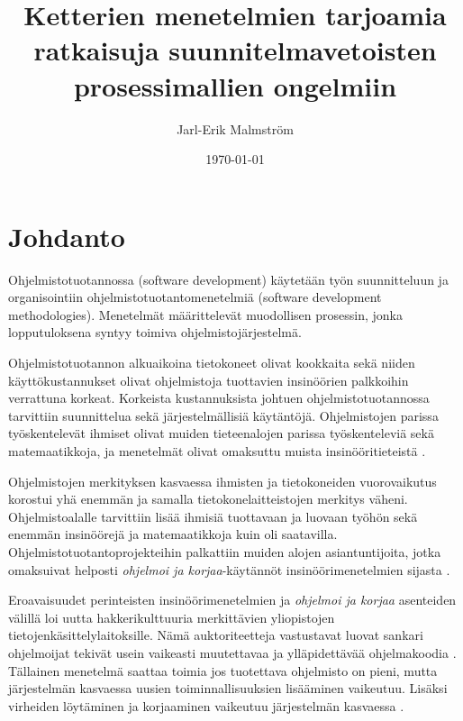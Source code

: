 \documentclass[finnish]{tktltiki2}
\title{Ketterien menetelmien tarjoamia ratkaisuja suunnitelmavetoisten prosessimallien ongelmiin}
\author{Jarl-Erik Malmström}
\date{\today}
\theoremstyle{definition}
\theoremstyle{remark}
\begin{document}

\maketitle        %
\makeabstract     %

\tableofcontents  %
\newpage          %



\section{Johdanto}
 
Ohjelmistotuotannossa (software development) käytetään työn suunnitteluun ja organisointiin ohjelmistotuotantomenetelmiä (software development methodologies). Menetelmät määrittelevät muodollisen prosessin, jonka lopputuloksena syntyy toimiva ohjelmistojärjestelmä.

Ohjelmistotuotannon alkuaikoina tietokoneet olivat kookkaita sekä niiden käyttö\-kustannukset olivat ohjelmistoja tuottavien insinöörien palkkoihin verrattuna korkeat. Korkeista kustannuksista johtuen ohjelmistotuotannossa tarvittiin suunnittelua sekä järjestelmällisiä käytäntöjä. Ohjelmistojen parissa työskentelevät ihmiset olivat muiden tieteenalojen parissa työskenteleviä sekä matemaatikkoja, ja menetelmät olivat omaksuttu muista insinööritieteistä \cite{BOE06}.

Ohjelmistojen merkityksen kasvaessa ihmisten ja tietokoneiden vuorovaikutus korostui yhä enemmän ja samalla tietokonelaitteistojen merkitys väheni. Ohjelmistoalalle tarvittiin lisää ihmisiä tuottavaan ja luovaan työhön sekä enemmän insinöörejä ja matemaatikkoja kuin oli saatavilla. Ohjelmistotuotantoprojekteihin palkattiin muiden alojen asiantuntijoita, jotka omaksuivat helposti \textit{ohjelmoi ja korjaa}-käytännöt insinöörimenetelmien sijasta \cite{BOE06}.

Eroavaisuudet perinteisten insinöörimenetelmien ja \textit{ohjelmoi ja korjaa} asenteiden välillä loi uutta hakkerikulttuuria merkittävien yliopistojen tietojenkäsittelylaitoksille. Nämä auktoriteetteja vastustavat luovat sankari ohjelmoijat tekivät usein vaikeasti muutettavaa ja ylläpidettävää ohjelmakoodia \cite{BOE06}. Tällainen menetelmä saattaa toimia jos tuotettava ohjelmisto on pieni, mutta järjestelmän kasvaessa uusien toiminnallisuuksien lisääminen vaikeutuu. Lisäksi virheiden löytäminen ja korjaaminen vaikeutuu järjestelmän kasvaessa \cite{FOW01a}.
\end{document}
